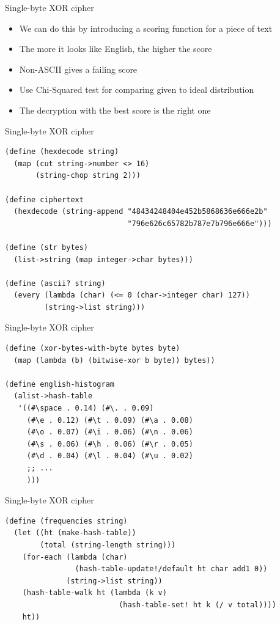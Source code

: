 \documentclass[presentation]{beamer}
\begin{document}
\begin{frame}[label=sec-2-8]{Single-byte XOR cipher}
\begin{itemize}
\item We can do this by introducing a scoring function for a piece of text
\item The more it looks like English, the higher the score
\item Non-ASCII gives a failing score
\item Use Chi-Squared test for comparing given to ideal distribution
\item The decryption with the best score is the right one
\end{itemize}
\end{frame}

\begin{frame}[fragile,label=sec-2-9]{Single-byte XOR cipher}
 \begin{verbatim}
(define (hexdecode string)
  (map (cut string->number <> 16)
       (string-chop string 2)))

(define ciphertext
  (hexdecode (string-append "48434248404e452b5868636e666e2b"
                            "796e626c65782b787e7b796e666e")))

(define (str bytes)
  (list->string (map integer->char bytes)))

(define (ascii? string)
  (every (lambda (char) (<= 0 (char->integer char) 127))
         (string->list string)))
\end{verbatim}
\end{frame}

\begin{frame}[fragile,label=sec-2-10]{Single-byte XOR cipher}
 \begin{verbatim}
(define (xor-bytes-with-byte bytes byte)
  (map (lambda (b) (bitwise-xor b byte)) bytes))

(define english-histogram
  (alist->hash-table
   '((#\space . 0.14) (#\. . 0.09)
     (#\e . 0.12) (#\t . 0.09) (#\a . 0.08)
     (#\o . 0.07) (#\i . 0.06) (#\n . 0.06)
     (#\s . 0.06) (#\h . 0.06) (#\r . 0.05)
     (#\d . 0.04) (#\l . 0.04) (#\u . 0.02)
     ;; ...
     )))
\end{verbatim}
\end{frame}

\begin{frame}[fragile,label=sec-2-11]{Single-byte XOR cipher}
 \begin{verbatim}
(define (frequencies string)
  (let ((ht (make-hash-table))
        (total (string-length string)))
    (for-each (lambda (char)
                (hash-table-update!/default ht char add1 0))
              (string->list string))
    (hash-table-walk ht (lambda (k v)
                          (hash-table-set! ht k (/ v total))))
    ht))
\end{verbatim}
\end{frame}
\end{document}
